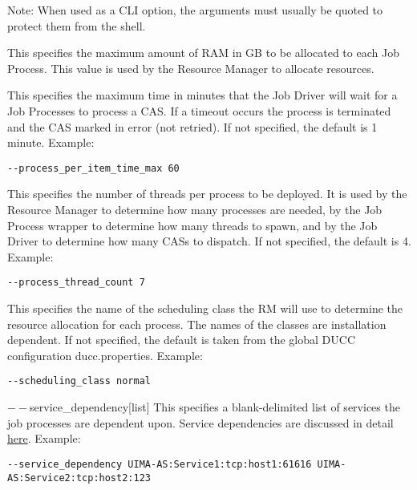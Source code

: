 \begin{description}
             Note: When used as a CLI option, the arguments must usually be
             quoted to protect them from the shell.
                          
           \item[$--$process\_memory\_size {[size]} ] This specifies the maximum amount of RAM in GB
             to be allocated to each Job Process.  This value is used by the Resource Manager to
             allocate resources.

           \item[$--$process\_per\_item\_time\_max {[integer]} ] This specifies the maximum time in
             minutes that the Job Driver will wait for a Job Processes to process a CAS. If a
             timeout occurs the process is terminated and the CAS marked in error (not retried). If
             not specified, the default is 1 minute. Example:
             \begin{verbatim}
--process_per_item_time_max 60 
             \end{verbatim}
             
           \item[$--$process\_thread\_count {[integer]} ] This specifies the number of threads per
             process to be deployed. It is used by the Resource Manager to determine how many
             processes are needed, by the Job Process wrapper to determine how many threads to
             spawn, and by the Job Driver to determine how many CASs to dispatch. If not specified,
             the default is 4. Example:
             \begin{verbatim}
--process_thread_count 7 
             \end{verbatim}
             
           \item[$--$scheduling\_class {[classname]} ] This specifies the name of the scheduling class
             the RM will use to determine the resource allocation for each process. The names of the
             classes are installation dependent. If not specified, the default is taken from the
             global DUCC configuration ducc.properties.  Example:
             \begin{verbatim}
--scheduling_class normal 
             \end{verbatim}
          

           \begin{sloppypar}             
           \item[$--$service\_dependency{[list]}] This specifies a blank-delimited list of services the job
             processes are dependent upon. Service dependencies are discussed in detail
             \hyperref[sec:service.endpoints]{here}. Example:
\begin{verbatim}
--service_dependency UIMA-AS:Service1:tcp:host1:61616 UIMA-AS:Service2:tcp:host2:123 
\end{verbatim}
           \end{sloppypar}
           

\end{description}
